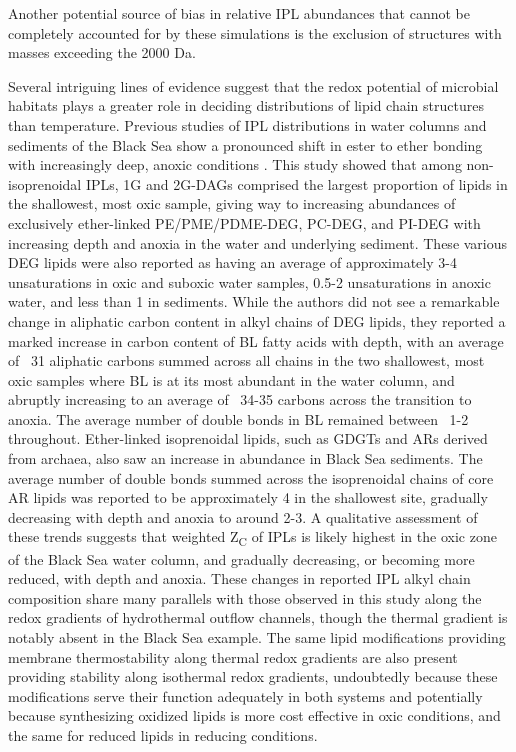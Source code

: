 Another potential source of bias in relative IPL abundances that cannot be completely accounted for by these simulations is the exclusion of structures with masses exceeding the 2000 Da.


Several intriguing lines of evidence suggest that the redox potential of microbial habitats plays a greater role in deciding distributions of lipid chain structures than temperature. Previous studies of IPL distributions in water columns and sediments of the Black Sea show a pronounced shift in ester to ether bonding with increasingly deep, anoxic conditions \citep{schroder2015intact}. This study showed that among non-isoprenoidal IPLs, 1G and 2G-DAGs comprised the largest proportion of lipids in the shallowest, most oxic sample, giving way to increasing abundances of exclusively ether-linked PE/PME/PDME-DEG, PC-DEG, and PI-DEG with increasing depth and anoxia in the water and underlying sediment. These various DEG lipids were also reported as having an average of approximately 3-4 unsaturations in oxic and suboxic water samples, 0.5-2 unsaturations in anoxic water, and less than 1 in sediments. While the authors did not see a remarkable change in aliphatic carbon content in alkyl chains of DEG lipids, they reported a marked increase in carbon content of BL fatty acids with depth, with an average of ~31 aliphatic carbons summed across all chains in the two shallowest, most oxic samples where BL is at its most abundant in the water column, and abruptly increasing to an average of ~34-35 carbons across the transition to anoxia. The average number of double bonds in BL remained between ~1-2 throughout.  Ether-linked isoprenoidal lipids, such as GDGTs and ARs derived from archaea, also saw an increase in abundance in Black Sea sediments. The average number of double bonds summed across the isoprenoidal chains of core AR lipids was reported to be approximately 4 in the shallowest site, gradually decreasing with depth and anoxia to around 2-3. A qualitative assessment of these trends suggests that weighted Z\textsubscript{C} of IPLs is likely highest in the oxic zone of the Black Sea water column, and gradually decreasing, or becoming more reduced, with depth and anoxia. These changes in reported IPL alkyl chain composition share many parallels with those observed in this study along the redox gradients of hydrothermal outflow channels, though the thermal gradient is notably absent in the Black Sea example. The same lipid modifications providing membrane thermostability along thermal redox gradients are also present providing stability along isothermal redox gradients, undoubtedly because these modifications serve their function adequately in both systems and potentially because synthesizing oxidized lipids is more cost effective in oxic conditions, and the same for reduced lipids in reducing conditions.




